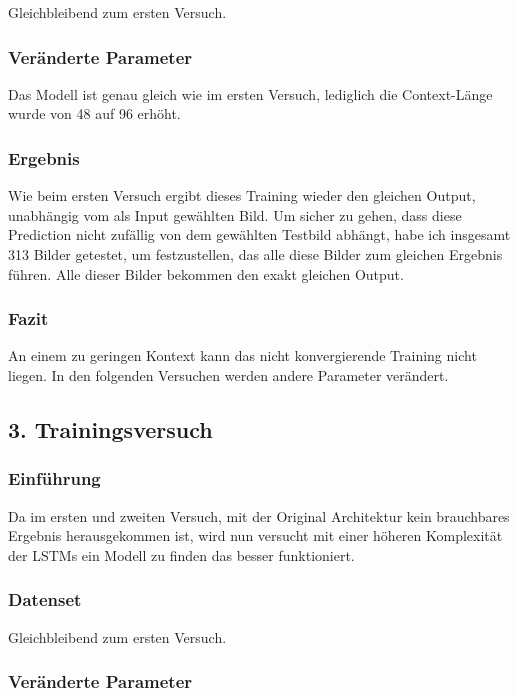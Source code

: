 \documentclass[pdftex,a4paper,halfparskip, article]{scrartcl}
\begin{document}
Gleichbleibend zum ersten Versuch.

\subsubsection*{Veränderte Parameter}

Das Modell ist genau gleich wie im ersten Versuch, lediglich die Context-Länge wurde von 48 auf 96 erhöht.

\subsubsection*{Ergebnis}

Wie beim ersten Versuch ergibt dieses Training wieder den gleichen Output, unabhängig vom als Input gewählten Bild. Um sicher zu gehen, dass diese Prediction nicht zufällig von dem gewählten Testbild abhängt, habe ich insgesamt 313 Bilder getestet, um festzustellen, das alle diese Bilder zum gleichen Ergebnis führen. Alle dieser Bilder bekommen den exakt gleichen Output.

\subsubsection*{Fazit}

An einem zu geringen Kontext kann das nicht konvergierende Training nicht liegen. In den folgenden Versuchen werden andere Parameter verändert.

\subsection{3. Trainingsversuch}


\subsubsection*{Einführung}

Da im ersten und zweiten Versuch, mit der Original Architektur kein brauchbares Ergebnis herausgekommen ist, wird nun versucht mit einer höheren Komplexität der LSTMs ein Modell zu finden das besser funktioniert.

\subsubsection*{Datenset}

Gleichbleibend zum ersten Versuch.

\subsubsection*{Veränderte Parameter}
\end{document}
